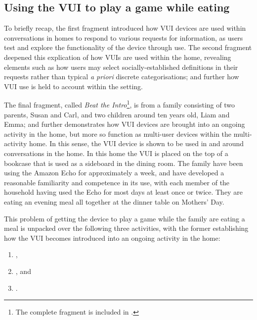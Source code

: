 \subsection{Using the VUI to play a game while eating}\label{sec:empirical home findings game}
\begin{revisedsubmission}
To briefly recap, the first fragment introduced how \ac{VUI} devices are used within conversations in homes to respond to various requests for information, as users test and explore the functionality of the device through use.
The second fragment deepened this explication of how \acp{VUI} are used within the home, revealing elements such as how users may select socially-established definitions in their requests rather than typical \textit{a priori} discrete categorisations; and further how \ac{VUI} use is held to account within the setting.

The final fragment, called \textit{Beat the Intro}\footnote{The complete fragment is included in .}, is from a family consisting of two parents, Susan and Carl, and two children around ten years old, Liam and Emma; and further demonstrates how \ac{VUI} devices are brought into an ongoing  activity in the home, but more so function as multi-user devices within the multi-activity home.
In this sense, the \ac{VUI} device is shown to be used in and around conversations in the home.
In this home the \ac{VUI} is placed on the top of a bookcase that is used as a sideboard in the dining room.
The family have been using the Amazon Echo for approximately a week, and have developed a reasonable familiarity and competence in its use, with each member of the household having used the Echo for most days at least once or twice.
They are eating an evening meal all together at the dinner table on Mothers' Day.

This problem of getting the device to play a game while the family are eating a meal is unpacked over the following three activities, with the former establishing how the \ac{VUI} becomes introduced into an ongoing activity in the home:
\begin{enumerate}[label=(\roman*)]
\item {},
\item {}, and
\item {}.
\end{enumerate}

\end{revisedsubmission}



